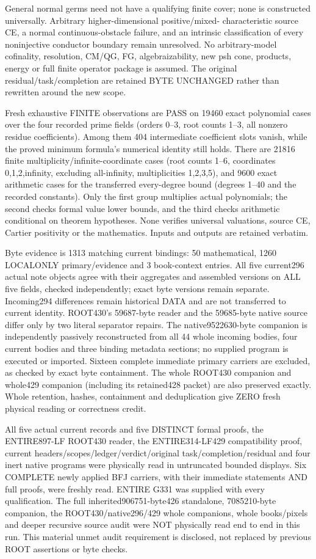 General normal germs need not have a qualifying finite cover; none is
constructed universally. Arbitrary higher-dimensional positive/mixed-
characteristic source CE, a normal continuous-obstacle failure, and an
intrinsic classification of every noninjective conductor boundary remain
unresolved. No arbitrary-model cofinality, resolution, CM/QG, FG,
algebraizability, new psh cone, products, energy or full finite operator
package is assumed. The original residual/task/completion are retained
BYTE UNCHANGED rather than rewritten around the new scope.

Fresh exhaustive FINITE observations are PASS on 19460 exact polynomial
cases over the four recorded prime fields (orders 0--3, root counts 1--3,
all nonzero residue coefficients). Among them 404 intermediate coefficient
slots vanish, while the proved minimum formula's numerical identity still
holds. There are 21816 finite multiplicity/infinite-coordinate cases
(root counts 1--6, coordinates 0,1,2,infinity, excluding all-infinity,
multiplicities 1,2,3,5), and 9600 exact arithmetic cases for the transferred
every-degree bound (degrees 1--40 and the recorded constants). Only the
first group multiplies actual polynomials; the second checks formal value
lower bounds, and the third checks arithmetic conditional on theorem
hypotheses. None verifies universal valuations, source CE, Cartier
positivity or the mathematics. Inputs and outputs are retained verbatim.

Byte evidence is 1313 matching current bindings: 50 mathematical,
1260 LOCALONLY primary/evidence and 3 book-context entries. All five
current296 actual note objects agree with their aggregates and assembled
versions on ALL five fields, checked independently; exact byte versions
remain separate. Incoming294 differences remain historical DATA and are
not transferred to current identity. ROOT430's 59687-byte reader and
the 59685-byte native source differ only by two literal separator repairs.
The native9522630-byte companion is independently passively reconstructed
from all 44 whole incoming bodies, four current bodies and three binding
metadata sections; no supplied program is executed or imported. Sixteen
complete immediate primary carriers are excluded, as checked by exact
byte containment. The whole ROOT430 companion and whole429 companion
(including its retained428 packet) are also preserved exactly. Whole
retention, hashes, containment and deduplication give ZERO fresh physical
reading or correctness credit.

All five actual current records and five DISTINCT formal proofs, the
ENTIRE897-LF ROOT430 reader, the ENTIRE314-LF429 compatibility proof,
current headers/scopes/ledger/verdict/original task/completion/residual and
four inert native programs were physically read in untruncated bounded
displays. Six COMPLETE newly applied BFJ carriers, with their immediate
statements AND full proofs, were freshly read. ENTIRE G331 was supplied
with every qualification. The full inherited906751-byte426 standalone,
7085210-byte companion, the ROOT430/native296/429 whole companions,
whole books/pixels and deeper recursive source audit were NOT physically
read end to end in this run. This material unmet audit requirement is
disclosed, not replaced by previous ROOT assertions or byte checks.

